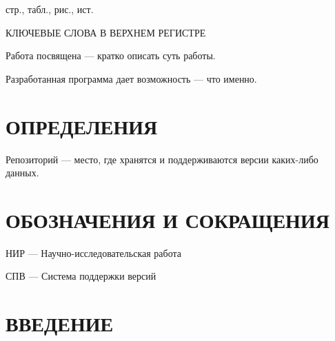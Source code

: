 \documentclass[a4paper,12pt]{article}
\newcounter{mycitecount}                                %
\begin{document}
 стр.,  табл.,  рис., \totalmycitecounts ист. 

КЛЮЧЕВЫЕ СЛОВА В ВЕРХНЕМ РЕГИСТРЕ

Работа посвящена --- кратко описать суть работы.

Разработанная программа дает возможность --- что именно.

\pagebreak
\thispagestyle{empty}

\section*{\centering ОПРЕДЕЛЕНИЯ}

Репозиторий --- место, где хранятся и поддерживаются версии каких-либо данных. 

\pagebreak

\section*{\centering ОБОЗНАЧЕНИЯ И СОКРАЩЕНИЯ}


НИР --- Научно-исследовательская работа

СПВ --- Система поддержки версий



\pagebreak



\tableofcontents

\pagebreak

\section*{\centering ВВЕДЕНИЕ}
\pagebreak

%
\pagebreak
\pagebreak
\pagebreak



\end{document}
